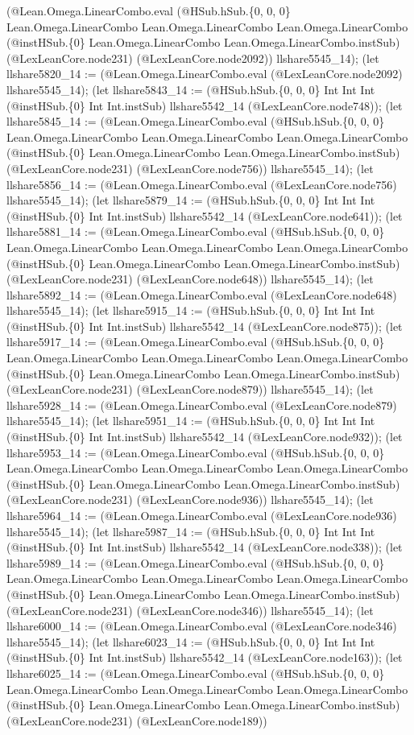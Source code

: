 \documentclass[11pt]{article}
\begin{document}
(@Lean.Omega.LinearCombo.eval (@HSub.hSub.\{0, 0, 0\} Lean.Omega.LinearCombo Lean.Omega.LinearCombo Lean.Omega.LinearCombo (@instHSub.\{0\} Lean.Omega.LinearCombo Lean.Omega.LinearCombo.instSub) (@LexLeanCore.node231) (@LexLeanCore.node2092)) llshare5545\_14); (let llshare5820\_14 := (@Lean.Omega.LinearCombo.eval (@LexLeanCore.node2092) llshare5545\_14); (let llshare5843\_14 := (@HSub.hSub.\{0, 0, 0\} Int Int Int (@instHSub.\{0\} Int Int.instSub) llshare5542\_14 (@LexLeanCore.node748)); (let llshare5845\_14 := (@Lean.Omega.LinearCombo.eval (@HSub.hSub.\{0, 0, 0\} Lean.Omega.LinearCombo Lean.Omega.LinearCombo Lean.Omega.LinearCombo (@instHSub.\{0\} Lean.Omega.LinearCombo Lean.Omega.LinearCombo.instSub) (@LexLeanCore.node231) (@LexLeanCore.node756)) llshare5545\_14); (let llshare5856\_14 := (@Lean.Omega.LinearCombo.eval (@LexLeanCore.node756) llshare5545\_14); (let llshare5879\_14 := (@HSub.hSub.\{0, 0, 0\} Int Int Int (@instHSub.\{0\} Int Int.instSub) llshare5542\_14 (@LexLeanCore.node641)); (let llshare5881\_14 := (@Lean.Omega.LinearCombo.eval (@HSub.hSub.\{0, 0, 0\} Lean.Omega.LinearCombo Lean.Omega.LinearCombo Lean.Omega.LinearCombo (@instHSub.\{0\} Lean.Omega.LinearCombo Lean.Omega.LinearCombo.instSub) (@LexLeanCore.node231) (@LexLeanCore.node648)) llshare5545\_14); (let llshare5892\_14 := (@Lean.Omega.LinearCombo.eval (@LexLeanCore.node648) llshare5545\_14); (let llshare5915\_14 := (@HSub.hSub.\{0, 0, 0\} Int Int Int (@instHSub.\{0\} Int Int.instSub) llshare5542\_14 (@LexLeanCore.node875)); (let llshare5917\_14 := (@Lean.Omega.LinearCombo.eval (@HSub.hSub.\{0, 0, 0\} Lean.Omega.LinearCombo Lean.Omega.LinearCombo Lean.Omega.LinearCombo (@instHSub.\{0\} Lean.Omega.LinearCombo Lean.Omega.LinearCombo.instSub) (@LexLeanCore.node231) (@LexLeanCore.node879)) llshare5545\_14); (let llshare5928\_14 := (@Lean.Omega.LinearCombo.eval (@LexLeanCore.node879) llshare5545\_14); (let llshare5951\_14 := (@HSub.hSub.\{0, 0, 0\} Int Int Int (@instHSub.\{0\} Int Int.instSub) llshare5542\_14 (@LexLeanCore.node932)); (let llshare5953\_14 := (@Lean.Omega.LinearCombo.eval (@HSub.hSub.\{0, 0, 0\} Lean.Omega.LinearCombo Lean.Omega.LinearCombo Lean.Omega.LinearCombo (@instHSub.\{0\} Lean.Omega.LinearCombo Lean.Omega.LinearCombo.instSub) (@LexLeanCore.node231) (@LexLeanCore.node936)) llshare5545\_14); (let llshare5964\_14 := (@Lean.Omega.LinearCombo.eval (@LexLeanCore.node936) llshare5545\_14); (let llshare5987\_14 := (@HSub.hSub.\{0, 0, 0\} Int Int Int (@instHSub.\{0\} Int Int.instSub) llshare5542\_14 (@LexLeanCore.node338)); (let llshare5989\_14 := (@Lean.Omega.LinearCombo.eval (@HSub.hSub.\{0, 0, 0\} Lean.Omega.LinearCombo Lean.Omega.LinearCombo Lean.Omega.LinearCombo (@instHSub.\{0\} Lean.Omega.LinearCombo Lean.Omega.LinearCombo.instSub) (@LexLeanCore.node231) (@LexLeanCore.node346)) llshare5545\_14); (let llshare6000\_14 := (@Lean.Omega.LinearCombo.eval (@LexLeanCore.node346) llshare5545\_14); (let llshare6023\_14 := (@HSub.hSub.\{0, 0, 0\} Int Int Int (@instHSub.\{0\} Int Int.instSub) llshare5542\_14 (@LexLeanCore.node163)); (let llshare6025\_14 := (@Lean.Omega.LinearCombo.eval (@HSub.hSub.\{0, 0, 0\} Lean.Omega.LinearCombo Lean.Omega.LinearCombo Lean.Omega.LinearCombo (@instHSub.\{0\} Lean.Omega.LinearCombo Lean.Omega.LinearCombo.instSub) (@LexLeanCore.node231) (@LexLeanCore.node189)) 
\end{document}

